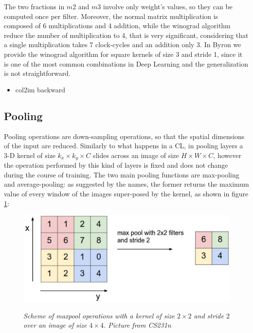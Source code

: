 \documentclass[12pt,a4paper]{report}
\begin{document}
The two fractions in $m2$ and $m3$ involve only weight's values, so they can be computed once per filter. Moreover, the normal matrix multiplication is composed of 6 multiplications and 4 addition, while the winograd algorithm reduce the number of multiplication to 4, that is very significant, considering that a  single multiplication takes 7 clock-cycles and an addition only 3. 
In Byron we provide the winograd algorithm for square kernels of size 3 and stride 1, since it is one of the most common combinations in Deep Learning and the generalization is not straightforward.

\begin{itemize}
 \item col2im backward
\end{itemize}
 
\subsection*{Pooling}

Pooling operations are down-sampling operations, so that the spatial dimensions of the input are reduced. Similarly to what happens in a CL, in pooling layers a 3-D kernel of size $k_x \times k_y \times C$ slides across an image of size $H \times W \times C$, however the operation performed by this kind of layers is fixed and does not change during the course of training.
The two main pooling functions are max-pooling and average-pooling: as suggested by the names, the former  
returns the maximum value of every window of the images super-posed by the kernel, as shown in figure \ref{fig:maxpool}:

\begin{figure}[h]
 \centering
 \includegraphics[scale=0.35]{./images/maxpool.png}
 \label{fig:maxpool}
 \caption{\it Scheme of maxpool operations with a kernel of size $2 \times 2$ and stride $2$ over an image of size $4 \times 4$. Picture from CS231n}
\end{figure}
\end{document}
